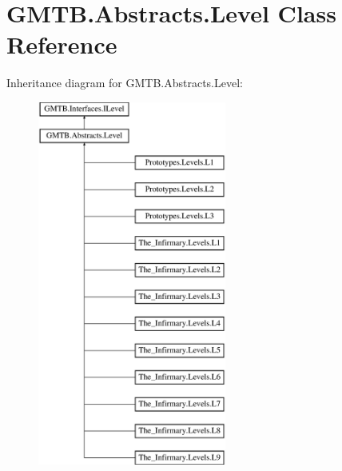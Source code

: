 \hypertarget{class_g_m_t_b_1_1_abstracts_1_1_level}{}\section{G\+M\+T\+B.\+Abstracts.\+Level Class Reference}
\label{class_g_m_t_b_1_1_abstracts_1_1_level}
Inheritance diagram for G\+M\+T\+B.\+Abstracts.\+Level\+:\begin{figure}[H]
\begin{center}
\leavevmode
\includegraphics[height=12.000000cm]{class_g_m_t_b_1_1_abstracts_1_1_level}
\end{center}
\end{figure}

